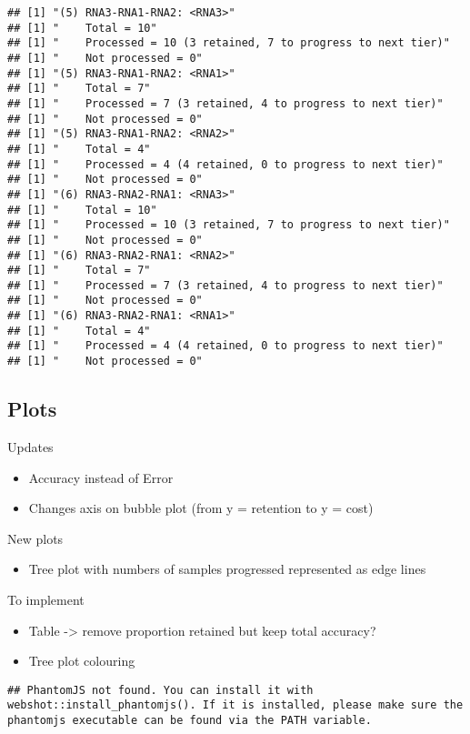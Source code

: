 \documentclass[
]{article}
\providecommand{\tightlist}{%
  \setlength{\itemsep}{0pt}\setlength{\parskip}{0pt}}
\begin{document}
\begin{verbatim}
## [1] "(5) RNA3-RNA1-RNA2: <RNA3>"
## [1] "    Total = 10"
## [1] "    Processed = 10 (3 retained, 7 to progress to next tier)"
## [1] "    Not processed = 0"
## [1] "(5) RNA3-RNA1-RNA2: <RNA1>"
## [1] "    Total = 7"
## [1] "    Processed = 7 (3 retained, 4 to progress to next tier)"
## [1] "    Not processed = 0"
## [1] "(5) RNA3-RNA1-RNA2: <RNA2>"
## [1] "    Total = 4"
## [1] "    Processed = 4 (4 retained, 0 to progress to next tier)"
## [1] "    Not processed = 0"
## [1] "(6) RNA3-RNA2-RNA1: <RNA3>"
## [1] "    Total = 10"
## [1] "    Processed = 10 (3 retained, 7 to progress to next tier)"
## [1] "    Not processed = 0"
## [1] "(6) RNA3-RNA2-RNA1: <RNA2>"
## [1] "    Total = 7"
## [1] "    Processed = 7 (3 retained, 4 to progress to next tier)"
## [1] "    Not processed = 0"
## [1] "(6) RNA3-RNA2-RNA1: <RNA1>"
## [1] "    Total = 4"
## [1] "    Processed = 4 (4 retained, 0 to progress to next tier)"
## [1] "    Not processed = 0"
\end{verbatim}

\hypertarget{plots}{%
\subsection{Plots}\label{plots}}

Updates

\begin{itemize}
\tightlist
\item
  Accuracy instead of Error
\item
  Changes axis on bubble plot (from y = retention to y = cost)
\end{itemize}

New plots

\begin{itemize}
\tightlist
\item
  Tree plot with numbers of samples progressed represented as edge lines
\end{itemize}

To implement

\begin{itemize}
\tightlist
\item
  Table -\textgreater{} remove proportion retained but keep total
  accuracy?
\item
  Tree plot colouring
\end{itemize}

\begin{verbatim}
## PhantomJS not found. You can install it with webshot::install_phantomjs(). If it is installed, please make sure the phantomjs executable can be found via the PATH variable.
\end{verbatim}
\end{document}
